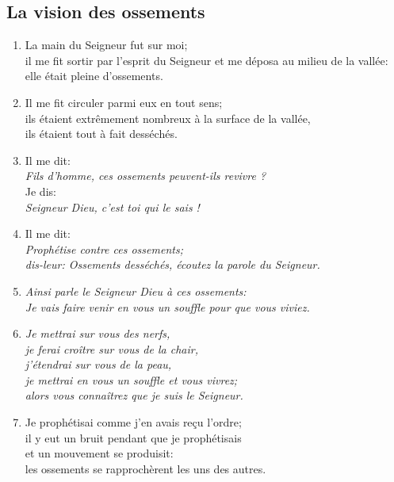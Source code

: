 \documentclass[12pt,a4paper,titlepage]{article}
\def \pslabelsep{0.2em} %
\def \psleftmargin{0em} %
\begin{document}
\subsection*{La vision des ossements}
\begin{enumerate}[leftmargin=\psleftmargin, labelsep = \pslabelsep, label={\arabic*}, font=\color{\pscolor}\small\textsuperscript, parsep=0em, itemsep=0em, topsep=0em ]
\item La main du Seigneur fut sur moi; \\ il me fit sortir par l’esprit du Seigneur et me déposa au milieu de la vallée: \\ elle était pleine d’ossements.
\item Il me fit circuler parmi eux en tout sens; \\ ils étaient extrêmement nombreux à la surface de la vallée, \\ ils étaient tout à fait desséchés.
\item Il me dit: \\ \decalage \og{}\emph{Fils d’homme, ces ossements peuvent-ils revivre ?}\fg{} \\ Je dis: \\
\decalage \og{}\emph{Seigneur Dieu, c’est toi qui le sais !}\fg{}
\item Il me dit: \\ \decalage \og{}\emph{Prophétise contre ces ossements; \\ \decalage dis-leur: Ossements desséchés, écoutez la parole du Seigneur.}
\item \decalage \emph{Ainsi parle le Seigneur Dieu à ces ossements: \\ \decalage Je vais faire venir en vous un souffle pour que vous viviez.}
\item \decalage \emph{Je mettrai sur vous des nerfs, \\ \decalage je ferai croître sur vous de la chair, \\ \decalage j’étendrai sur vous de la peau, \\ \decalage je mettrai en vous un souffle et vous vivrez; \\ \decalage alors vous connaîtrez que je suis le Seigneur.}\fg{}
\item Je prophétisai comme j’en avais reçu l’ordre; \\ il y eut un bruit pendant que je prophétisais \\ et un mouvement se produisit: \\ les ossements se rapprochèrent les uns des autres.

\end{enumerate}
\end{document}
